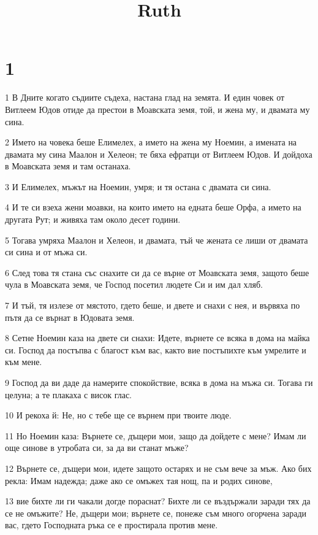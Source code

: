 

\title{Ruth}


\chapter{1}

\par 1 В Дните когато съдиите съдеха, настана глад на земята. И един човек от Витлеем Юдов отиде да престои в Моавската земя, той, и жена му, и двамата му сина.
\par 2 Името на човека беше Елимелех, а името на жена му Ноемин, а имената на двамата му сина Маалон и Хелеон; те бяха ефратци от Витлеем Юдов. И дойдоха в Моавската земя и там останаха.
\par 3 И Елимелех, мъжът на Ноемин, умря; и тя остана с двамата си сина.
\par 4 И те си взеха жени моавки, на които името на едната беше Орфа, а името на другата Рут; и живяха там около десет години.
\par 5 Тогава умряха Маалон и Хелеон, и двамата, тъй че жената се лиши от двамата си сина и от мъжа си.
\par 6 След това тя стана със снахите си да се върне от Моавската земя, защото беше чула в Моавската земя, че Господ посетил людете Си и им дал хляб.
\par 7 И тъй, тя излезе от мястото, гдето беше, и двете и снахи с нея, и вървяха по пътя да се върнат в Юдовата земя.
\par 8 Сетне Ноемин каза на двете си снахи: Идете, върнете се всяка в дома на майка си. Господ да постъпва с благост към вас, както вие постъпихте към умрелите и към мене.
\par 9 Господ да ви даде да намерите спокойствие, всяка в дома на мъжа си. Тогава ги целуна; а те плакаха с висок глас.
\par 10 И рекоха й: Не, но с тебе ще се върнем при твоите люде.
\par 11 Но Ноемин каза: Върнете се, дъщери мои, защо да дойдете с мене? Имам ли още синове в утробата си, за да ви станат мъже?
\par 12 Върнете се, дъщери мои, идете защото остарях и не съм вече за мъж. Ако бих рекла: Имам надежда; даже ако се омъжех тая нощ, па и родих синове,
\par 13 вие бихте ли ги чакали догде пораснат? Бихте ли се въздържали заради тях да се не омъжите? Не, дъщери мои; върнете се, понеже съм много огорчена заради вас, гдето Господната ръка се е простирала против мене.

